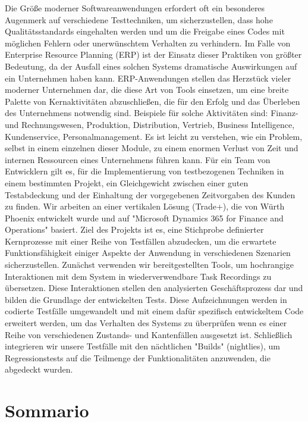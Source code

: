 Die Größe moderner Softwareanwendungen erfordert oft ein besonderes Augenmerk auf verschiedene Testtechniken, um sicherzustellen, dass hohe Qualitätsstandards eingehalten werden und um die Freigabe eines Codes mit möglichen Fehlern oder unerwünschtem Verhalten zu verhindern. 
Im Falle von Enterprise Resource Planning (ERP) ist der Einsatz dieser Praktiken von größter Bedeutung, da der Ausfall eines solchen Systems dramatische Auswirkungen auf ein Unternehmen haben kann. 
ERP-Anwendungen stellen das Herzstück vieler moderner Unternehmen dar, die diese Art von Tools einsetzen, um eine breite Palette von Kernaktivitäten abzuschließen, die für den Erfolg und das Überleben des Unternehmens notwendig sind. Beispiele für solche Aktivitäten sind: 
Finanz- und Rechnungswesen, Produktion, Distribution, Vertrieb, Business Intelligence, Kundenservice, Personalmanagement. 
Es ist leicht zu verstehen, wie ein Problem, selbst in einem einzelnen dieser Module, zu einem enormen Verlust von Zeit und internen Ressourcen eines Unternehmens führen kann. 
Für ein Team von Entwicklern gilt es, für die Implementierung von testbezogenen Techniken in einem bestimmten Projekt, ein Gleichgewicht zwischen einer guten Testabdeckung und der Einhaltung der vorgegebenen Zeitvorgaben des Kunden zu finden.
Wir arbeiten an einer vertikalen Lösung (Trade+), die von Würth Phoenix entwickelt wurde und auf "Microsoft Dynamics 365 for Finance and Operations" basiert. Ziel des Projekts ist es, eine Stichprobe definierter Kernprozesse mit einer Reihe von Testfällen abzudecken, um die erwartete Funktionsfähigkeit einiger Aspekte der Anwendung in verschiedenen Szenarien sicherzustellen. 
Zunächst verwenden wir bereitgestellten Tools, um hochrangige Interaktionen mit dem System in wiederverwendbare Task Recordings  zu übersetzen. Diese Interaktionen stellen den analysierten Geschäftsprozess dar und bilden die Grundlage der entwickelten Tests.
Diese Aufzeichnungen werden in codierte Testfälle umgewandelt und mit einem dafür spezifisch entwickeltem Code erweitert werden, um das Verhalten des Systems zu überprüfen wenn es einer Reihe von verschiedenen Zustands- und Kantenfällen ausgesetzt ist. 
Schließlich integrieren wir unsere Testfälle mit den nächtlichen "Builds" (nightlies), um Regressionstests auf die Teilmenge der Funktionalitäten anzuwenden, die abgedeckt wurden. 

\chapter*{Sommario}

